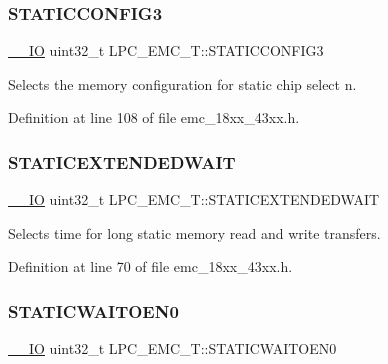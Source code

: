 \subsubsection{\texorpdfstring{S\+T\+A\+T\+I\+C\+C\+O\+N\+F\+I\+G3}{STATICCONFIG3}}
{\footnotesize\ttfamily \hyperlink{core__sc300_8h_aec43007d9998a0a0e01faede4133d6be}{\+\_\+\+\_\+\+IO} uint32\+\_\+t L\+P\+C\+\_\+\+E\+M\+C\+\_\+\+T\+::\+S\+T\+A\+T\+I\+C\+C\+O\+N\+F\+I\+G3}

Selects the memory configuration for static chip select n. 

Definition at line 108 of file emc\+\_\+18xx\+\_\+43xx.\+h.

\mbox{\label{struct_l_p_c___e_m_c___t_a165975a224bd75738ff2235a915b50a5}} 
\subsubsection{\texorpdfstring{S\+T\+A\+T\+I\+C\+E\+X\+T\+E\+N\+D\+E\+D\+W\+A\+IT}{STATICEXTENDEDWAIT}}
{\footnotesize\ttfamily \hyperlink{core__sc300_8h_aec43007d9998a0a0e01faede4133d6be}{\+\_\+\+\_\+\+IO} uint32\+\_\+t L\+P\+C\+\_\+\+E\+M\+C\+\_\+\+T\+::\+S\+T\+A\+T\+I\+C\+E\+X\+T\+E\+N\+D\+E\+D\+W\+A\+IT}

Selects time for long static memory read and write transfers. 

Definition at line 70 of file emc\+\_\+18xx\+\_\+43xx.\+h.

\mbox{\label{struct_l_p_c___e_m_c___t_a2d31f509bae16e486993a9ba57db54f7}} 
\subsubsection{\texorpdfstring{S\+T\+A\+T\+I\+C\+W\+A\+I\+T\+O\+E\+N0}{STATICWAITOEN0}}
{\footnotesize\ttfamily \hyperlink{core__sc300_8h_aec43007d9998a0a0e01faede4133d6be}{\+\_\+\+\_\+\+IO} uint32\+\_\+t L\+P\+C\+\_\+\+E\+M\+C\+\_\+\+T\+::\+S\+T\+A\+T\+I\+C\+W\+A\+I\+T\+O\+E\+N0}

